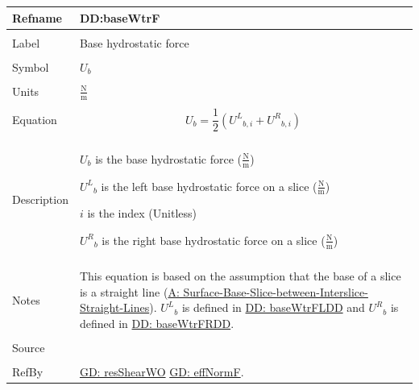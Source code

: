 \documentclass[12pt]{article}
\begin{document}
\noindent \begin{minipage}{\textwidth}
\begin{tabular}{p{} p{}}
\toprule \textbf{Refname} & \textbf{DD:baseWtrF}
\label{DD:baseWtrF}
\\ \midrule \\
Label & Base hydrostatic force
        \\ \midrule \\
        Symbol & ${U_{b}}$
                 \\ \midrule \\
                 Units & $\frac{\text{N}}{\text{m}}$
                         \\ \midrule \\
                         Equation & \begin{displaymath}
                                    {U_{b}}=\frac{1}{2} \left({{U^{L}}_{b,i}}+{{U^{R}}_{b,i}}\right)
                                    \end{displaymath}
                                    \\ \midrule \\
                                    Description & \begin{symbDescription}
                                                  \item{${U_{b}}$ is the base hydrostatic force ($\frac{\text{N}}{\text{m}}$)}
                                                  \item{${{U^{L}}_{b}}$ is the left base hydrostatic force on a slice ($\frac{\text{N}}{\text{m}}$)}
                                                  \item{$i$ is the index (Unitless)}
                                                  \item{${{U^{R}}_{b}}$ is the right base hydrostatic force on a slice ($\frac{\text{N}}{\text{m}}$)}
                                                  \end{symbDescription}
                                                  \\ \midrule \\
                                                  Notes & This equation is based on the assumption that the base of a slice is a straight line (\hyperref[assumpSBSBISL]{A: Surface-Base-Slice-between-Interslice-Straight-Lines}). ${{U^{L}}_{b}}$ is defined in \hyperref[DD:baseWtrFLDD]{DD: baseWtrFLDD} and ${{U^{R}}_{b}}$ is defined in \hyperref[DD:baseWtrFRDD]{DD: baseWtrFRDD}.
                                                          \\ \midrule \\
                                                          Source & \cite{fredlund1977}
                                                                   \\ \midrule \\
                                                                   RefBy & \hyperref[GD:resShearWO]{GD: resShearWO} \hyperref[GD:effNormF]{GD: effNormF}.
\\ \bottomrule \end{tabular}
\end{minipage}
\end{document}
